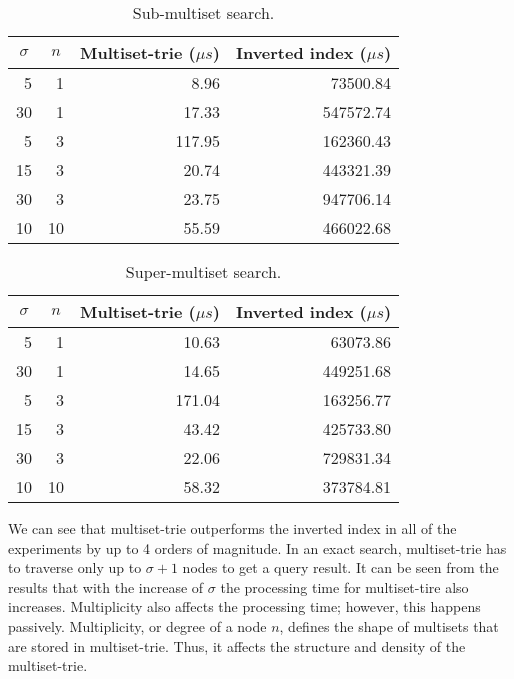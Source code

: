\begin{table}[h]
\center
\begin{tabular}{|r|r|r|r|}
\hline
\multicolumn{1}{|c|}{$\sigma$} & 
\multicolumn{1}{c|}{$n$} & 
\multicolumn{1}{c|}{Multiset-trie ($\mu s$)} & 
\multicolumn{1}{c|}{Inverted index ($\mu s$)} \\
\hline
5		& 1			& 8.96 & 73500.84\\
\hline
30	& 1			& 17.33 & 547572.74\\
\hline
5		& 3			& 117.95 & 162360.43\\
\hline
15	& 3			& 20.74 & 443321.39\\
\hline
30	& 3 		& 23.75 & 947706.14\\
\hline
10	& 10		& 55.59 & 466022.68\\
\hline
\end{tabular}
\caption{Sub-multiset search.}
\label{t:res_sub}
\end{table}

\begin{table}[h]
\center
\begin{tabular}{|r|r|r|r|}
\hline
\multicolumn{1}{|c|}{$\sigma$} & 
\multicolumn{1}{c|}{$n$} & 
\multicolumn{1}{c|}{Multiset-trie ($\mu s$)} & 
\multicolumn{1}{c|}{Inverted index ($\mu s$)} \\
\hline
5		& 1 		& 10.63 & 63073.86\\
\hline
30	& 1 		& 14.65 & 449251.68\\
\hline
5		& 3 		& 171.04 & 163256.77\\
\hline
15	& 3 		& 43.42 & 425733.80\\
\hline
30	& 3 		& 22.06 & 729831.34\\
\hline
10	& 10 	& 58.32 & 373784.81\\
\hline
\end{tabular}
\caption{Super-multiset search.}
\label{t:res_sup}
\end{table}

We can see that multiset-trie outperforms the inverted index in all of the
experiments by up to 4 orders of magnitude. In an exact search,
multiset-trie has to traverse only up to $\sigma+1$ nodes to get a query
result. It can be seen from the results that with the increase of $\sigma$
the processing time for multiset-tire also increases. Multiplicity
also affects the processing time; however, this happens
passively. Multiplicity, or degree of a node $n$, defines the shape of
multisets that are stored in multiset-trie. Thus, it affects the
structure and density of the multiset-trie.

